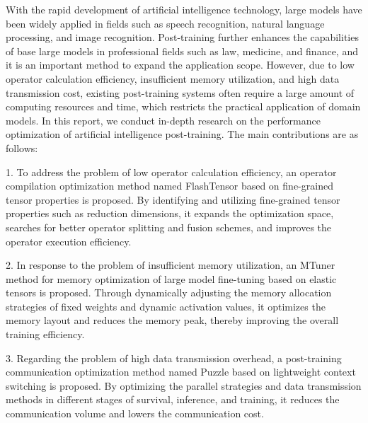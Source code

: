 \begin{abstract*}
  With the rapid development of artificial intelligence technology, large models have been widely applied in fields such as speech recognition, natural language processing, and image recognition.
  Post-training further enhances the capabilities of base large models in professional fields such as law, medicine, and finance, and it is an important method to expand the application scope.
  However, due to low operator calculation efficiency, insufficient memory utilization, and high data transmission cost, existing post-training systems often require a large amount of computing resources and time, which restricts the practical application of domain models.
  In this report, we conduct in-depth research on the performance optimization of artificial intelligence post-training. 
  The main contributions are as follows:

  1. To address the problem of low operator calculation efficiency, an operator compilation optimization method named FlashTensor based on fine-grained tensor properties is proposed. By identifying and utilizing fine-grained tensor properties such as reduction dimensions, it expands the optimization space, searches for better operator splitting and fusion schemes, and improves the operator execution efficiency.

  2. In response to the problem of insufficient memory utilization, an MTuner method for memory optimization of large model fine-tuning based on elastic tensors is proposed. Through dynamically adjusting the memory allocation strategies of fixed weights and dynamic activation values, it optimizes the memory layout and reduces the memory peak, thereby improving the overall training efficiency.

  3. Regarding the problem of high data transmission overhead, a post-training communication optimization method named Puzzle based on lightweight context switching is proposed. By optimizing the parallel strategies and data transmission methods in different stages of survival, inference, and training, it reduces the communication volume and lowers the communication cost.
  
\end{abstract*}
